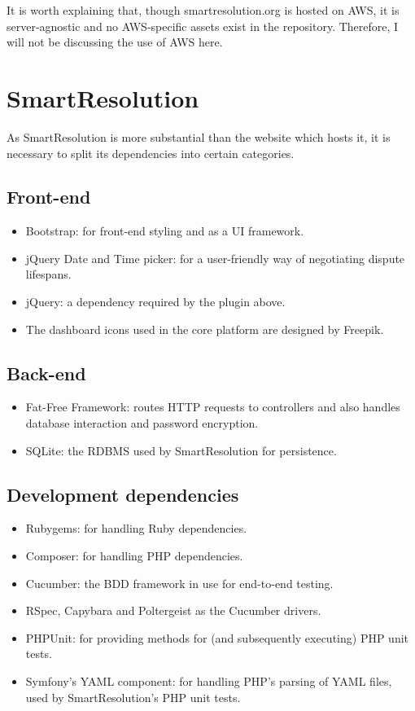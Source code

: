 It is worth explaining that, though smartresolution.org is hosted on AWS, it is server-agnostic and no AWS-specific assets exist in the repository. Therefore, I will not be discussing the use of AWS here.

\section{SmartResolution}

As SmartResolution is more substantial than the website which hosts it, it is necessary to split its dependencies into certain categories.

\subsection{Front-end}

\begin{itemize}
\item Bootstrap: for front-end styling and as a UI framework.
\item jQuery Date and Time picker: for a user-friendly way of negotiating dispute lifespans.
\item jQuery: a dependency required by the plugin above.
\item The dashboard icons used in the core platform are designed by Freepik.
\end{itemize}

\subsection{Back-end}

\begin{itemize}
\item Fat-Free Framework: routes HTTP requests to controllers and also handles database interaction and password encryption.
\item SQLite: the RDBMS used by SmartResolution for persistence.
\end{itemize}

\subsection{Development dependencies}

\begin{itemize}
\item Rubygems: for handling Ruby dependencies.
\item Composer: for handling PHP dependencies.
\item Cucumber: the BDD framework in use for end-to-end testing.
\item RSpec, Capybara and Poltergeist as the Cucumber drivers.
\item PHPUnit: for providing methods for (and subsequently executing) PHP unit tests.
\item Symfony's YAML component: for handling PHP's parsing of YAML files, used by SmartResolution's PHP unit tests.
\end{itemize}


